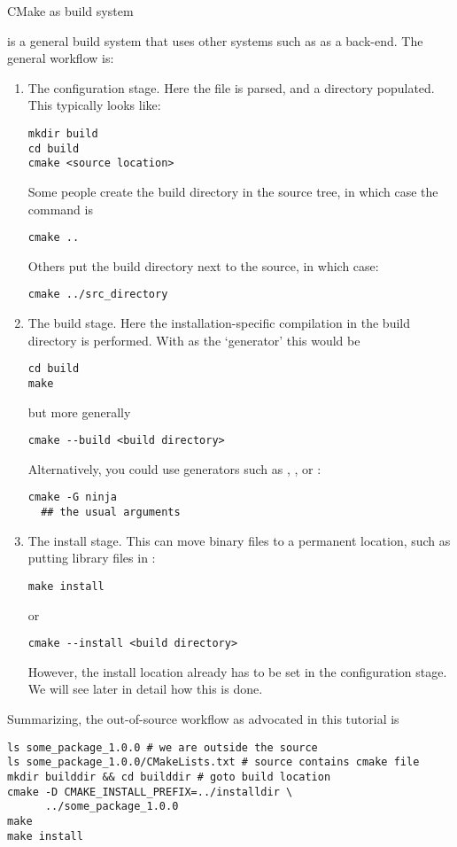  {CMake as build system}

 is a general build system that uses other systems
such as  as a back-end.
The general workflow is:
\begin{enumerate}
\item The configuration stage. Here the  file
  is parsed, and a  directory populated. This typically looks like:
\begin{verbatim}
mkdir build
cd build
cmake <source location>
\end{verbatim}
Some people create the build directory in the source tree,
in which case the  command is
\begin{verbatim}
cmake ..
\end{verbatim}
Others put the build directory next to the source, in which case:
\begin{verbatim}
cmake ../src_directory
\end{verbatim}
\item The build stage. Here the installation-specific compilation
  in the build directory is performed.
  With  as the `generator' this would be
\begin{verbatim}
cd build
make
\end{verbatim}
but more generally
\begin{verbatim}
cmake --build <build directory>
\end{verbatim}
Alternatively, you could use generators such as ,
, or :
\begin{verbatim}
cmake -G ninja
  ## the usual arguments
\end{verbatim}
\item The install stage. This can move binary files to a permanent
  location, such as putting library files in :
\begin{verbatim}
make install
\end{verbatim}
or 
\begin{verbatim}
cmake --install <build directory>
\end{verbatim}
However, the install location already has to be set in the configuration stage.
We will see later in detail how this is done.
\end{enumerate}

Summarizing, the out-of-source workflow as advocated in this tutorial is
\begin{verbatim}
ls some_package_1.0.0 # we are outside the source
ls some_package_1.0.0/CMakeLists.txt # source contains cmake file
mkdir builddir && cd builddir # goto build location
cmake -D CMAKE_INSTALL_PREFIX=../installdir \
      ../some_package_1.0.0
make
make install
\end{verbatim}

